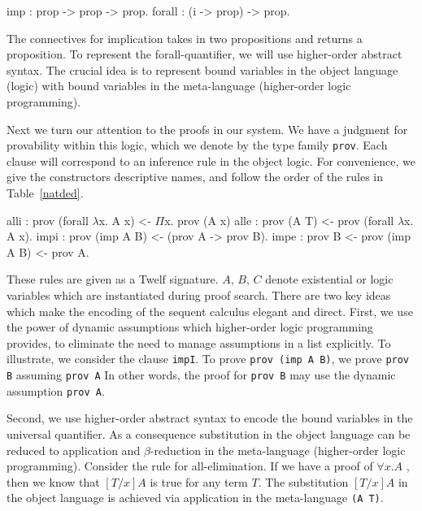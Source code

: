\documentclass{acmconf}
\newcommand{\z}{\mbox{}}
\begin{document}

\begin{code}
imp    : prop -> prop -> prop.
forall : (i -> prop) -> prop.
\end{code}

The connectives for implication takes in two propositions and returns a
proposition. To represent the forall-quantifier, we will use
higher-order abstract syntax. The crucial idea is to represent bound
variables in the object language (logic) with bound variables in the
meta-language (higher-order logic programming). 

Next we turn our attention to the proofs in our system. We have a
judgment for provability within this logic, which we denote by the
type family {\tt prov}.
%
%
Each clause will correspond to an inference rule in the object
logic. For convenience, we give the constructors 
descriptive names, and follow the order of the rules in
Table~\ref{natded}. 

\begin{code}
alli   : prov (forall $\lambda$x. A x)
            <- $\Pi$x. prov (A x)
alle   : prov (A T)
            <- prov (forall $\lambda$x. A x).
\z
impi     : prov (imp A B)
            <- (prov A -> prov B).
impe     : prov B
            <- prov (imp A B)
            <- prov A.
\end{code}


These rules are given as a Twelf signature. $A$, $B$, $C$ denote
existential or logic variables which are instantiated during proof
search. There are two key ideas which make the encoding of the sequent
calculus elegant and direct. First, we use the power of dynamic
assumptions which higher-order logic programming provides, to
eliminate the need to manage assumptions in a list explicitly. To
illustrate, we consider the clause {\tt impI}. To  prove {\tt prov
  (imp A B)}, we prove {\tt prov B} assuming {\tt prov A} In other words,
the proof for {\tt prov B} may use the dynamic assumption {\tt prov A}. 

Second, we use higher-order abstract syntax to encode the bound
variables in the universal quantifier. As a consequence substitution
in the object language can be reduced to application and
$\beta$-reduction in the meta-language (higher-order logic
programming). Consider the rule for all-elimination. If we have a proof of
$\forall x.A$ , then we know that $[T/x]A$ is true for any term
$T$. The substitution $[T/x]A$ in the object language is achieved via
application in the meta-language {\tt (A T)}. 
\end{document}
